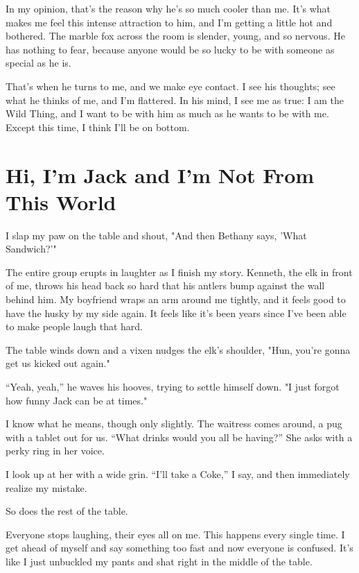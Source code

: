In my opinion, that's the reason why he's so much cooler than me. It's
what makes me feel this intense attraction to him, and I'm getting a
little hot and bothered. The marble fox across the room is slender,
young, and so nervous. He has nothing to fear, because anyone would be
so lucky to be with someone as special as he is.

That's when he turns to me, and we make eye contact. I see his thoughts;
see what he thinks of me, and I'm flattered. In his mind, I see me as
true: I am the Wild Thing, and I want to be with him as much as he wants
to be with me. Except this time, I think I'll be on bottom.


\chapter*{Hi, I'm Jack and I'm Not From This World}

I slap my paw on the table and shout, "And then Bethany says, 'What
Sandwich?'"

The entire group erupts in laughter as I finish my story. Kenneth, the
elk in front of me, throws his head back so hard that his antlers bump
against the wall behind him. My boyfriend wraps an arm around me
tightly, and it feels good to have the husky by my side again. It feels
like it's been years since I've been able to make people laugh that
hard.

The table winds down and a vixen nudges the elk's shoulder, "Hun, you're
gonna get us kicked out again."

``Yeah, yeah,'' he waves his hooves, trying to settle himself down. "I
just forgot how funny Jack can be at times."

I know what he means, though only slightly. The waitress comes around, a
pug with a tablet out for us. ``What drinks would you all be having?'' She
asks with a perky ring in her voice.

I look up at her with a wide grin. ``I'll take a Coke,'' I say, and then
immediately realize my mistake.

So does the rest of the table.

Everyone stops laughing, their eyes all on me. This happens every single
time. I get ahead of myself and say something too fast and now everyone
is confused. It's like I just unbuckled my pants and shat right in the
middle of the table.

